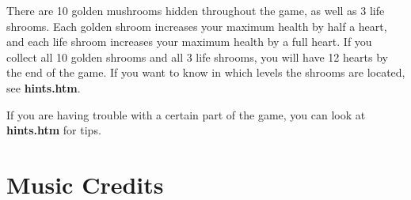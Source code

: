 \documentclass[11pt]{article}
\begin{document}
There are 10 golden mushrooms hidden throughout the game, as well as 3 life shrooms. Each golden shroom increases your maximum health by half a heart, and each life shroom increases your maximum health by a full heart. If you collect all 10 golden shrooms and all 3 life shrooms, you will have 12 hearts by the end of the game. If you want to know in which levels the shrooms are located, see \textbf{hints.htm}.

If you are having trouble with a certain part of the game, you can look at \textbf{hints.htm} for tips.

\section{Music Credits}

\fontsize{10}{12}\selectfont
\end{document}
